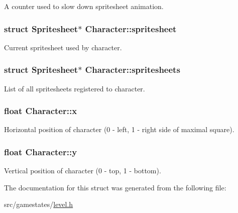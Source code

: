 A counter used to slow down spritesheet animation. \hypertarget{structCharacter_a8934aff2a077c832127154837f383ef0}{
\subsubsection[{spritesheet}]{\setlength{\rightskip}{0pt plus 5cm}struct {\bf Spritesheet}$\ast$ Character\+::spritesheet}}\label{structCharacter_a8934aff2a077c832127154837f383ef0}
Current spritesheet used by character. \hypertarget{structCharacter_a374e3f2ef020ce410bc7968488798714}{
\subsubsection[{spritesheets}]{\setlength{\rightskip}{0pt plus 5cm}struct {\bf Spritesheet}$\ast$ Character\+::spritesheets}}\label{structCharacter_a374e3f2ef020ce410bc7968488798714}
List of all spritesheets registered to character. \hypertarget{structCharacter_a8db8f4fb44d770f8324dff6714b8dc73}{
\subsubsection[{x}]{\setlength{\rightskip}{0pt plus 5cm}float Character\+::x}}\label{structCharacter_a8db8f4fb44d770f8324dff6714b8dc73}
Horizontal position of character (0 -\/ left, 1 -\/ right side of maximal square). \hypertarget{structCharacter_a4e074a7f769265983cb1b06249a6b617}{
\subsubsection[{y}]{\setlength{\rightskip}{0pt plus 5cm}float Character\+::y}}\label{structCharacter_a4e074a7f769265983cb1b06249a6b617}
Vertical position of character (0 -\/ top, 1 -\/ bottom). 

The documentation for this struct was generated from the following file\+:\begin{DoxyCompactItemize}
\item 
src/gamestates/\hyperlink{level_8h}{level.\+h}\end{DoxyCompactItemize}
